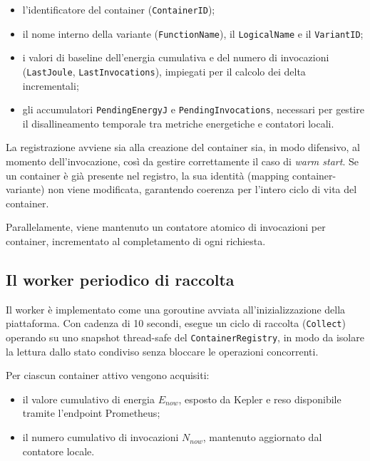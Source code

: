 \begin{itemize}
    \item l'identificatore del container (\texttt{ContainerID});
    \item il nome interno della variante (\texttt{FunctionName}), il
    \texttt{LogicalName} e il \texttt{VariantID};
    \item i valori di baseline dell'energia cumulativa e del numero di
    invocazioni (\texttt{LastJoule}, \texttt{LastInvocations}),
    impiegati per il calcolo dei delta incrementali;
    \item gli accumulatori \texttt{PendingEnergyJ} e
    \texttt{PendingInvocations}, necessari per gestire il disallineamento
    temporale tra metriche energetiche e contatori locali.
\end{itemize}

La registrazione avviene sia alla creazione del container sia, in modo
difensivo, al momento dell'invocazione, così da gestire correttamente il
caso di \emph{warm start}. Se un container è già presente nel registro,
la sua identità (mapping container-variante) non viene modificata,
garantendo coerenza per l'intero ciclo di vita del container.

Parallelamente, viene mantenuto un contatore atomico di invocazioni per
container, incrementato al completamento di ogni richiesta.

\subsection{Il worker periodico di raccolta}
\label{subsec:worker-periodico}

Il worker è implementato come una goroutine avviata all'inizializzazione
della piattaforma. Con cadenza di 10 secondi, esegue un ciclo di raccolta
(\texttt{Collect}) operando su uno snapshot thread-safe del
\texttt{ContainerRegistry}, in modo da isolare la lettura dallo stato
condiviso senza bloccare le operazioni concorrenti.

Per ciascun container attivo vengono acquisiti:

\begin{itemize}
    \item il valore cumulativo di energia $E_{now}$, esposto da Kepler e
    reso disponibile tramite l'endpoint Prometheus;
    \item il numero cumulativo di invocazioni $N_{now}$, mantenuto
    aggiornato dal contatore locale.
\end{itemize}


